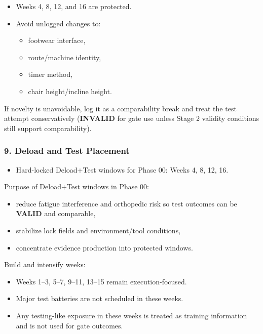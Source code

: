 \documentclass[10pt]{article}
\begin{document}
\begin{itemize}
\item Weeks 4, 8, 12, and 16 are protected.
\item Avoid unlogged changes to:
  \begin{itemize}
  \item footwear interface,
  \item route/machine identity,
  \item timer method,
  \item chair height/incline height.
  \end{itemize}
\end{itemize}

If novelty is unavoidable, log it as a comparability break and treat the test attempt conservatively (\textbf{INVALID} for gate use unless Stage 2 validity conditions still support comparability).

\subsubsection*{9. Deload and Test Placement}

\begin{itemize}
\item Hard-locked Deload+Test windows for Phase 00: Weeks 4, 8, 12, 16.
\end{itemize}

Purpose of Deload+Test windows in Phase 00:

\begin{itemize}
\item reduce fatigue interference and orthopedic risk so test outcomes can be \textbf{VALID} and comparable,
\item stabilize lock fields and environment/tool conditions,
\item concentrate evidence production into protected windows.
\end{itemize}

Build and intensify weeks:

\begin{itemize}
\item Weeks 1–3, 5–7, 9–11, 13–15 remain execution-focused.
\item Major test batteries are not scheduled in these weeks.
\item Any testing-like exposure in these weeks is treated as training information and is not used for gate outcomes.
\end{itemize}
\end{document}
